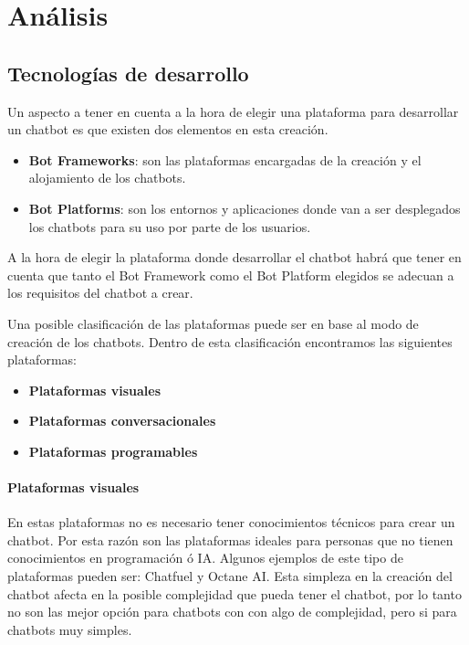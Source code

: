 \chapter{Análisis}


\section{Tecnologías de desarrollo}

Un aspecto a tener en cuenta a la hora de elegir una plataforma para desarrollar un chatbot es que existen dos elementos en esta creación.

\begin{itemize}
    \item \textbf{Bot Frameworks}: son las plataformas encargadas de la creación y el alojamiento de los chatbots.
    \item \textbf{Bot Platforms}: son los entornos y aplicaciones donde van a ser desplegados los chatbots para su uso por parte de los usuarios.
\end{itemize}

A la hora de elegir la plataforma donde desarrollar el chatbot habrá que tener en cuenta que tanto el Bot Framework como el Bot Platform elegidos se adecuan a los requisitos del chatbot a crear.

Una posible clasificación de las plataformas puede ser en base al modo de creación de los chatbots. Dentro de esta clasificación encontramos las siguientes plataformas:

\begin{itemize}
    \item \textbf{Plataformas visuales}
    \item \textbf{Plataformas conversacionales}
    \item \textbf{Plataformas programables}
\end{itemize}

\subsubsection*{Plataformas visuales}

En estas plataformas no es necesario tener conocimientos técnicos para crear un chatbot. Por esta razón son las plataformas ideales para personas que no tienen conocimientos en programación ó IA. Algunos ejemplos de este tipo de plataformas pueden ser: Chatfuel y Octane AI. Esta simpleza en la creación del chatbot afecta en la posible complejidad que pueda tener el chatbot, por lo tanto no son las mejor opción para chatbots con con algo de complejidad, pero si para chatbots muy simples.

